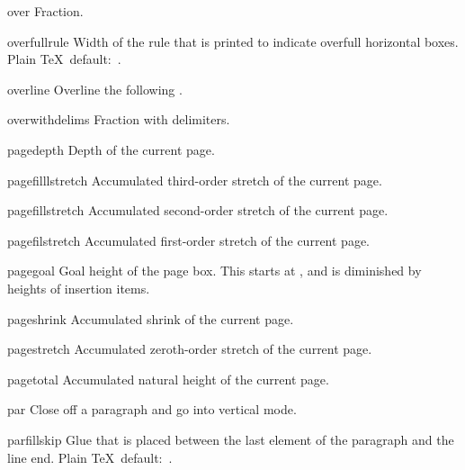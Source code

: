 \item over
      Fraction.

\item overfullrule
      Width of the rule that is printed to indicate 
      overfull horizontal boxes.
      Plain \TeX\ default:~\n{5pt}.

\item overline
      Overline the following .

\item overwithdelims
      Fraction with delimiters.

\item pagedepth
      Depth of the current page.

\item pagefilllstretch
      Accumulated third-order stretch of the current page.

\item pagefillstretch
      Accumulated second-order stretch of the current page.

\item pagefilstretch
      Accumulated first-order stretch of the current page.

\item pagegoal
      Goal height of the page box. This starts at ,
      and is diminished by heights of insertion items.

\item pageshrink
      Accumulated shrink of the current page.

\item pagestretch
      Accumulated zeroth-order stretch of the current page.

\item pagetotal
      Accumulated natural height of the current page.

\item par
      Close off a paragraph and go into vertical mode.

\item parfillskip
      Glue that is placed between the last          
      element of the paragraph and the line end.
      Plain \TeX\ default:~.

